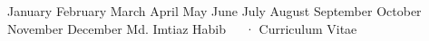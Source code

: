 \documentclass[11pt, a4paper]{awesome-cv}
\begin{document}
\makecvheader[C]


\makeatletter
\newcommand{\mydate}{\@ifundefined{mydate}{\today}{\mydate}}
\makeatother

\renewcommand{\mydate}{\ifcase\month\or
    January\or
    February\or
    March\or
    April\or
    May\or
    June\or
    July\or
    August\or
    September\or
    October\or
    November\or
    December\fi
    \space\number\year}
    
\makecvfooter
  {\mydate} %
  {Md. Imtiaz Habib~~~· Curriculum Vitae}
  {\thepage}











%




\end{document}
